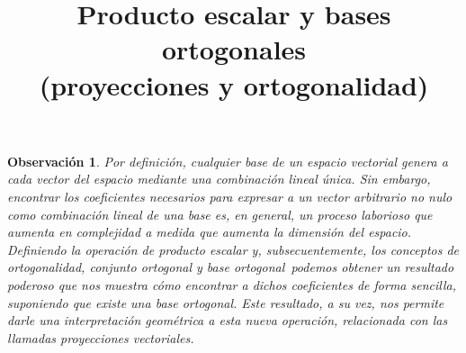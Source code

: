 \documentclass[12pt,dvipsnames]{article}
\newtheorem{obs}{Observación}[section]
\numberwithin{equation}{section}
\begin{document}
\title{Producto escalar y bases ortogonales \\ (proyecciones y ortogonalidad)}
\date{}
\maketitle

\begin{obs}
    Por definición, cualquier base de un espacio vectorial genera a cada vector del espacio mediante una combinación lineal única. Sin embargo, encontrar los coeficientes necesarios para expresar a un vector arbitrario no nulo como combinación lineal de una base es, en general, un proceso laborioso que aumenta en complejidad a medida que aumenta la dimensión del espacio. Definiendo la operación de producto escalar \textemdash y, subsecuentemente, los conceptos de ortogonalidad, conjunto ortogonal y base ortogonal\textemdash \ podemos obtener un resultado poderoso que nos muestra cómo encontrar a dichos coeficientes de forma sencilla, suponiendo que existe una base ortogonal. Este resultado, a su vez, nos permite darle una interpretación geométrica a esta nueva operación, relacionada con las llamadas proyecciones vectoriales.
\end{obs}
\end{document}
